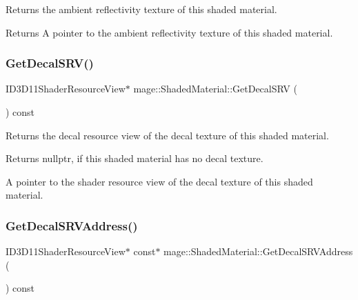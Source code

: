 Returns the ambient reflectivity texture of this shaded material.

\begin{DoxyReturn}{Returns}
A pointer to the ambient reflectivity texture of this shaded material. 
\end{DoxyReturn}
\hypertarget{structmage_1_1_shaded_material_ad16addcaa9b32b7a9d5ce793d55b1b2c}{}\label{structmage_1_1_shaded_material_ad16addcaa9b32b7a9d5ce793d55b1b2c} 
\subsubsection{\texorpdfstring{Get\+Decal\+S\+R\+V()}{GetDecalSRV()}}
{\footnotesize\ttfamily I\+D3\+D11\+Shader\+Resource\+View$\ast$ mage\+::\+Shaded\+Material\+::\+Get\+Decal\+S\+RV (\begin{DoxyParamCaption}{ }\end{DoxyParamCaption}) const\hspace{0.3cm}{\ttfamily [noexcept]}}

Returns the decal resource view of the decal texture of this shaded material.

\begin{DoxyReturn}{Returns}
{\ttfamily nullptr}, if this shaded material has no decal texture. 

A pointer to the shader resource view of the decal texture of this shaded material. 
\end{DoxyReturn}
\hypertarget{structmage_1_1_shaded_material_ac6bd86176058b7fdeb4c9a7823ff8c71}{}\label{structmage_1_1_shaded_material_ac6bd86176058b7fdeb4c9a7823ff8c71} 
\subsubsection{\texorpdfstring{Get\+Decal\+S\+R\+V\+Address()}{GetDecalSRVAddress()}}
{\footnotesize\ttfamily I\+D3\+D11\+Shader\+Resource\+View$\ast$ const$\ast$ mage\+::\+Shaded\+Material\+::\+Get\+Decal\+S\+R\+V\+Address (\begin{DoxyParamCaption}{ }\end{DoxyParamCaption}) const\hspace{0.3cm}{\ttfamily [noexcept]}}

